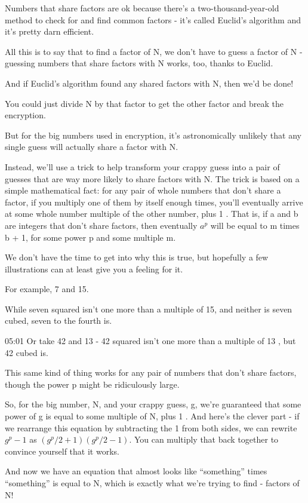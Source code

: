 \documentclass[../main.tex]{subfiles}
\begin{document}
Numbers that share factors are ok because there’s a two-thousand-year-old method to check for and find common factors - it’s called Euclid’s algorithm and it’s pretty darn efficient.

All this is to say that to find a factor of N, we don't have to guess a factor of N - guessing numbers that share factors with N works, too, thanks to Euclid.

And if Euclid’s algorithm found any shared factors with N, then we’d be done!

You could just divide N by that factor to get the other factor and break the encryption.

But for the big numbers used in encryption, it’s astronomically unlikely that any single guess will actually share a factor with N.

Instead, we’ll use a trick to help transform your crappy guess into a pair of guesses that are way more likely to share factors with N. The trick is based on a simple mathematical fact: for any pair of whole numbers that don’t share a factor, if you multiply one of them by itself enough times, you’ll eventually arrive at some whole number multiple of the other number, plus 1 . That is, if a and b are integers that don’t share factors, then eventually $a^p$ will be equal to m times b + 1, for some power p and some multiple m.

We don't have the time to get into why this is true, but hopefully a few illustrations can at least give you a feeling for it.

For example, 7 and 15.

While seven squared isn’t one more than a multiple of 15, and neither is seven cubed, seven to the fourth is.

05:01	Or take 42 and 13 - 42 squared isn’t one more than a multiple of 13 , but 42 cubed is.

This same kind of thing works for any pair of numbers that don't share factors, though the power p might be ridiculously large.

So, for the big number, N, and your crappy guess, g, we’re guaranteed that some power of g is equal to some multiple of N, plus 1 . And here’s the clever part - if we rearrange this equation by subtracting the 1 from both sides, we can rewrite $g^p-1$ as $(g^p/2 + 1)(g^p/2- 1)$. You can multiply that back together to convince yourself that it works.

And now we have an equation that almost looks like “something” times “something” is equal to N, which is exactly what we’re trying to find - factors of N!
\end{document}
